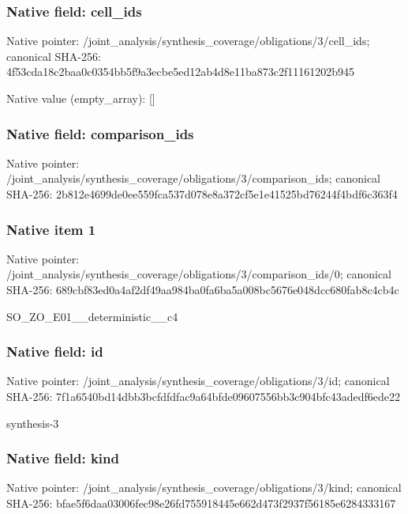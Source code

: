 \documentclass[10pt,a4paper]{article}
\begin{document}
\subsubsection{Native field: cell\_\allowbreak{}ids}
Native pointer: /joint\_\allowbreak{}analysis/synthesis\_\allowbreak{}coverage/obligations/3/cell\_\allowbreak{}ids; canonical SHA-256: 4f53cda18c2baa0c0354bb5f9a3ecbe5ed12ab4d8e11ba873c2f11161202b945

Native value (empty\_\allowbreak{}array): []

\subsubsection{Native field: comparison\_\allowbreak{}ids}
Native pointer: /joint\_\allowbreak{}analysis/synthesis\_\allowbreak{}coverage/obligations/3/comparison\_\allowbreak{}ids; canonical SHA-256: 2b812e4699de0ee559fca537d078e8a372cf5e1e41525bd76244f4bdf6c363f4

\subsubsection{Native item 1}
Native pointer: /joint\_\allowbreak{}analysis/synthesis\_\allowbreak{}coverage/obligations/3/comparison\_\allowbreak{}ids/0; canonical SHA-256: 689cbf83ed0a4af2df49aa984ba0fa6ba5a008bc5676e048dcc680fab8c4cb4c

\begingroup\raggedright\sloppy SO\_\allowbreak{}ZO\_\allowbreak{}E01\_\allowbreak{}\_\allowbreak{}deterministic\_\allowbreak{}\_\allowbreak{}c4\par\endgroup

\subsubsection{Native field: id}
Native pointer: /joint\_\allowbreak{}analysis/synthesis\_\allowbreak{}coverage/obligations/3/id; canonical SHA-256: 7f1a6540bd14dbb3bcfdfdfac9a64bfde09607556bb3c904bfc43adedf6ede22

\begingroup\raggedright\sloppy synthesis-3\par\endgroup

\subsubsection{Native field: kind}
Native pointer: /joint\_\allowbreak{}analysis/synthesis\_\allowbreak{}coverage/obligations/3/kind; canonical SHA-256: bfae5f6daa03006fec98e26fd755918445e662d473f2937f56185e6284333167
\end{document}
